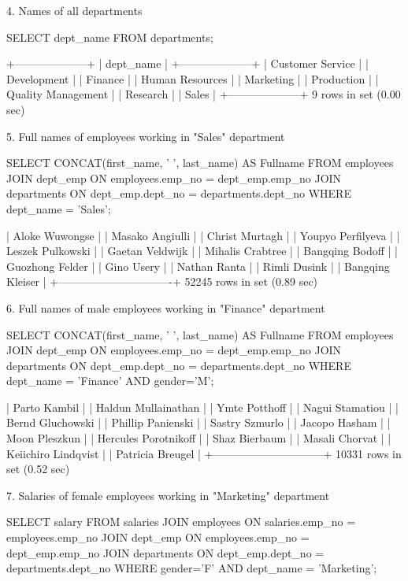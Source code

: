 4. Names of all departments

SELECT dept_name FROM departments;

+--------------------+
| dept_name          |
+--------------------+
| Customer Service   |
| Development        |
| Finance            |
| Human Resources    |
| Marketing          |
| Production         |
| Quality Management |
| Research           |
| Sales              |
+--------------------+
9 rows in set (0.00 sec)

5. Full names of employees working in "Sales" department

SELECT CONCAT(first_name, ' ', last_name) AS Fullname FROM employees 
JOIN dept_emp ON employees.emp_no = dept_emp.emp_no
JOIN departments ON dept_emp.dept_no = departments.dept_no
WHERE dept_name = 'Sales';

| Aloke Wuwongse                |
| Masako Angiulli               |
| Christ Murtagh                |
| Youpyo Perfilyeva             |
| Leszek Pulkowski              |
| Gaetan Veldwijk               |
| Mihalis Crabtree              |
| Bangqing Bodoff               |
| Guozhong Felder               |
| Gino Usery                    |
| Nathan Ranta                  |
| Rimli Dusink                  |
| Bangqing Kleiser              |
+-------------------------------+
52245 rows in set (0.89 sec)

6. Full names of male employees working in "Finance" department

SELECT CONCAT(first_name, ' ', last_name) AS Fullname FROM employees 
JOIN dept_emp ON employees.emp_no = dept_emp.emp_no
JOIN departments ON dept_emp.dept_no = departments.dept_no
WHERE dept_name = 'Finance' AND gender='M';

| Parto Kambil                 |
| Haldun Mullainathan          |
| Ymte Potthoff                |
| Nagui Stamatiou              |
| Bernd Gluchowski             |
| Phillip Panienski            |
| Sastry Szmurlo               |
| Jacopo Hasham                |
| Moon Pleszkun                |
| Hercules Porotnikoff         |
| Shaz Bierbaum                |
| Masali Chorvat               |
| Keiichiro Lindqvist          |
| Patricia Breugel             |
+------------------------------+
10331 rows in set (0.52 sec)

7. Salaries of female employees working in "Marketing" department

SELECT salary FROM salaries JOIN employees ON salaries.emp_no = employees.emp_no
JOIN dept_emp ON employees.emp_no = dept_emp.emp_no
JOIN departments ON dept_emp.dept_no = departments.dept_no
WHERE gender='F' AND dept_name = 'Marketing'; 

